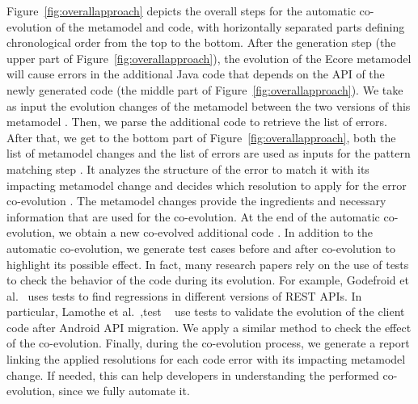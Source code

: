 Figure~\ref{fig:overallapproach} depicts the overall steps for the automatic co-evolution of the metamodel and code, with horizontally separated parts defining chronological order from the top to the bottom.
After the generation step (the upper part of Figure~\ref{fig:overallapproach}), the evolution of the Ecore metamodel will cause errors in the additional Java code that depends on the API of the newly generated code (the middle part of Figure~\ref{fig:overallapproach}). We take as input the evolution changes of the metamodel between the two versions of this metamodel {\small{}}. Then, we parse the additional code  {\small{}} to retrieve the list of errors. 
After that, we get to the bottom part of Figure~\ref{fig:overallapproach}, both the list of metamodel changes and the list of errors are used as inputs for the pattern matching step {\small{}}. It analyzes the structure of the error to match it with its impacting metamodel change and decides which resolution to apply for the error co-evolution {\small{}}. The metamodel changes provide the ingredients and necessary information that are used for the co-evolution.  
At the end of the automatic co-evolution, we obtain a new co-evolved additional code {\small{}}. 
In addition to the automatic co-evolution, we generate test cases before and after co-evolution to highlight its possible effect. In fact, many research papers rely on the use of tests to check the behavior of the code during its evolution. For example, Godefroid et al.~\cite{10.1145/3395363.3397374} uses tests to find regressions in different versions of REST APIs. In particular, Lamothe et al.~\cite{9079197},test ~\cite{10.1145/3387905.3388608} use tests to validate the evolution of the client code after Android API migration. We apply a similar method to check the effect of the co-evolution. \cite{10.5555/2486788.2486855}
Finally, during the co-evolution process, we generate a report linking the applied resolutions for each code error with its impacting metamodel change. If needed, this can help developers in understanding the performed co-evolution, since we fully automate it.
